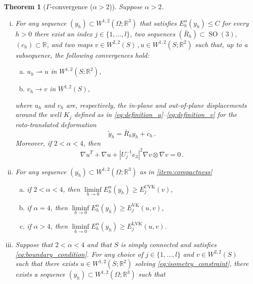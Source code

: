 \documentclass{article}
\theoremstyle{plain}
\newtheorem{teo}{Theorem}[section]
\theoremstyle{plain}
\theoremstyle{plain}
\theoremstyle{plain}
\theoremstyle{plain}
\theoremstyle{definition}
\theoremstyle{definition}
\renewcommand{\r}{\mathbb{R}}
\newcommand{\todeb}{\rightharpoonup}
\DeclareMathOperator{\SO}{SO}
\DeclareMathOperator{\VK}{VK}
\DeclareMathOperator{\LVK}{LVK}
\DeclareMathOperator{\CVK}{CVK}
\begin{document}
\begin{teo}[$\Gamma$-convergence ($\alpha > 2$)]\label{teo:gamma_convergence}
	Suppose $\alpha > 2$.
	\begin{enumerate}[(i)]
		\item For any sequence $(y_h) \subset W^{1,2}(\Omega; \r^3)$ that satisfies $E_h^\alpha(y_h) \leq C$ for every $h > 0$ there exist an index $j \in \{1, \dots, l\}$, two sequences $(\bar R_h) \subset \SO(3)$, $(c_h) \subset \r$, and two maps $v \in W^{2,2}(S)\,, u \in W^{1,2}(S; \r^2)$ such that, up to a subsequence, the following convergences hold:
		\begin{enumerate}[(a)]
			\item $u_h \todeb u$ in $W^{1,2}(S; \r^2)$, \label{item:convergence_u}
			\item $v_h \to v$ in $W^{1,2}(S)$, \label{item:convergence_v}
		\end{enumerate}
		where $u_h$ and $v_h$ are, respectively, the in-plane and out-of-plane displacements around the well $K_j$ defined as in \eqref{eq:definition_u}--\eqref{eq:definition_v} for the roto-translated deformation
		\[
		\tilde y_h = \bar R_h y_h + c_h\,.
		\] 
		Moreover, if $2 < \alpha < 4$, then
		\begin{equation} \label{eq:isometry_constraint}
				\nabla u^T + \nabla u + |U^{-1}_j e_3|^2 \nabla v \otimes \nabla v = 0 \,.
		\end{equation} \label{item:compactness}
		\item For any sequence $(y_h) \subset W^{1,2}(\Omega; \r^3)$ as in \ref{item:compactness}
		\begin{enumerate}[(a)]
			\item if $2 < \alpha < 4$, then $ \liminf\limits_{h \to 0} E_h^\alpha(y_h) \geq E_j^{\CVK}(v)$,
			\item if $\alpha = 4$, then $ \liminf\limits_{h \to 0} E_h^\alpha(y_h) \geq E_j^{\VK}(u, v)$,
			\item if $\alpha > 4$, then $ \liminf\limits_{h \to 0} E_h^\alpha(y_h) \geq E_j^{\LVK}(u, v)$.
		\end{enumerate}\label{item:liminf_inequality}
	\item Suppose that $2 < \alpha < 4$ and that $S$ is simply connected and satisfies \eqref{eq:boundary_condition}. For any choice of $j \in \{1, \dots, l\}$ and $v \in W^{2,2}(S)$ such that there exists $u \in W^{1, 2}(S; \r^2)$ solving \eqref{eq:isometry_constraint}, there exists a sequence $(y_h) \subset W^{1,2}(\Omega; \r^3)$ such that
	\begin{enumerate}[(a)]

\end{enumerate}
\end{enumerate}
\end{teo}
\end{document}
